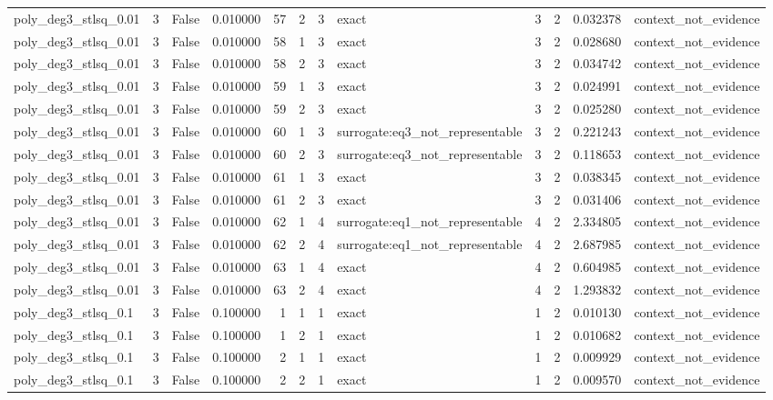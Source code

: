 \begin{tabular}{lrrrrrrlrrrl}
poly\_deg3\_stlsq\_0.01 & 3 & False & 0.010000 & 57 & 2 & 3 & exact & 3 & 2 & 0.032378 & context\_not\_evidence \\
poly\_deg3\_stlsq\_0.01 & 3 & False & 0.010000 & 58 & 1 & 3 & exact & 3 & 2 & 0.028680 & context\_not\_evidence \\
poly\_deg3\_stlsq\_0.01 & 3 & False & 0.010000 & 58 & 2 & 3 & exact & 3 & 2 & 0.034742 & context\_not\_evidence \\
poly\_deg3\_stlsq\_0.01 & 3 & False & 0.010000 & 59 & 1 & 3 & exact & 3 & 2 & 0.024991 & context\_not\_evidence \\
poly\_deg3\_stlsq\_0.01 & 3 & False & 0.010000 & 59 & 2 & 3 & exact & 3 & 2 & 0.025280 & context\_not\_evidence \\
poly\_deg3\_stlsq\_0.01 & 3 & False & 0.010000 & 60 & 1 & 3 & surrogate:eq3\_not\_representable & 3 & 2 & 0.221243 & context\_not\_evidence \\
poly\_deg3\_stlsq\_0.01 & 3 & False & 0.010000 & 60 & 2 & 3 & surrogate:eq3\_not\_representable & 3 & 2 & 0.118653 & context\_not\_evidence \\
poly\_deg3\_stlsq\_0.01 & 3 & False & 0.010000 & 61 & 1 & 3 & exact & 3 & 2 & 0.038345 & context\_not\_evidence \\
poly\_deg3\_stlsq\_0.01 & 3 & False & 0.010000 & 61 & 2 & 3 & exact & 3 & 2 & 0.031406 & context\_not\_evidence \\
poly\_deg3\_stlsq\_0.01 & 3 & False & 0.010000 & 62 & 1 & 4 & surrogate:eq1\_not\_representable & 4 & 2 & 2.334805 & context\_not\_evidence \\
poly\_deg3\_stlsq\_0.01 & 3 & False & 0.010000 & 62 & 2 & 4 & surrogate:eq1\_not\_representable & 4 & 2 & 2.687985 & context\_not\_evidence \\
poly\_deg3\_stlsq\_0.01 & 3 & False & 0.010000 & 63 & 1 & 4 & exact & 4 & 2 & 0.604985 & context\_not\_evidence \\
poly\_deg3\_stlsq\_0.01 & 3 & False & 0.010000 & 63 & 2 & 4 & exact & 4 & 2 & 1.293832 & context\_not\_evidence \\
poly\_deg3\_stlsq\_0.1 & 3 & False & 0.100000 & 1 & 1 & 1 & exact & 1 & 2 & 0.010130 & context\_not\_evidence \\
poly\_deg3\_stlsq\_0.1 & 3 & False & 0.100000 & 1 & 2 & 1 & exact & 1 & 2 & 0.010682 & context\_not\_evidence \\
poly\_deg3\_stlsq\_0.1 & 3 & False & 0.100000 & 2 & 1 & 1 & exact & 1 & 2 & 0.009929 & context\_not\_evidence \\
poly\_deg3\_stlsq\_0.1 & 3 & False & 0.100000 & 2 & 2 & 1 & exact & 1 & 2 & 0.009570 & context\_not\_evidence \\

\end{tabular}
